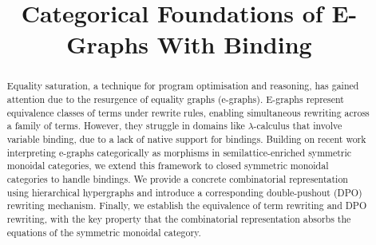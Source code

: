 \documentclass[acmsmall,screen, nonacm, review, anonymous, authoryear]{acmart}
\title{Categorical Foundations of E-Graphs With Binding}
\begin{document}
\begin{abstract}
    Equality saturation, a technique for program optimisation and reasoning, has gained attention due to the resurgence of equality graphs (e-graphs). 
	E-graphs represent equivalence classes of terms under rewrite rules, enabling simultaneous rewriting across a family of terms. 
	However, they struggle in domains like $\lambda$-calculus that involve variable binding, due to a lack of native support for bindings.
	Building on recent work interpreting e-graphs categorically as morphisms in semilattice-enriched symmetric monoidal categories, we extend this framework to closed symmetric monoidal categories to handle bindings. 
	We provide a concrete combinatorial representation using hierarchical hypergraphs and introduce a corresponding double-pushout (DPO) rewriting mechanism. 
	Finally, we establish the equivalence of term rewriting and DPO rewriting, with the key property that the combinatorial representation absorbs the equations of the symmetric monoidal category.
\end{abstract}

\maketitle











\appendix

% 
\end{document}

